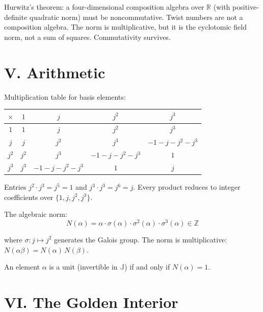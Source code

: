 \documentclass[11pt, a4paper]{article}
\newcommand{\TT}{\mathbb{J}}
\begin{document}
\vspace{0.5em}

Hurwitz's theorem: a four-dimensional composition algebra over $\mathbb{R}$ (with positive-definite quadratic norm) must be noncommutative. Twist numbers are not a composition algebra. The norm is multiplicative, but it is the cyclotomic field norm, not a sum of squares. Commutativity survives.

\section*{V. Arithmetic}

Multiplication table for basis elements:

\renewcommand{\arraystretch}{1.5}
\begin{tabularx}{\textwidth}{CCCCC}
\toprule
$\times$ & $1$ & $j$ & $j^2$ & $j^3$ \\
\midrule
$1$ & $1$ & $j$ & $j^2$ & $j^3$ \\[0.2em]
$j$ & $j$ & $j^2$ & $j^3$ & $-1{-}j{-}j^2{-}j^3$ \\[0.2em]
$j^2$ & $j^2$ & $j^3$ & $-1{-}j{-}j^2{-}j^3$ & $1$ \\[0.2em]
$j^3$ & $j^3$ & $-1{-}j{-}j^2{-}j^3$ & $1$ & $j$ \\
\bottomrule
\end{tabularx}

\vspace{0.5em}

Entries $j^2 \cdot j^3 = j^5 = 1$ and $j^3 \cdot j^3 = j^6 = j$. Every product reduces to integer coefficients over $\{1, j, j^2, j^3\}$.

The algebraic norm:
\begin{equation*}
N(\alpha) = \alpha \cdot \sigma(\alpha) \cdot \sigma^2(\alpha) \cdot \sigma^3(\alpha) \in \mathbb{Z}
\end{equation*}

where $\sigma: j \mapsto j^2$ generates the Galois group. The norm is multiplicative: $N(\alpha\beta) = N(\alpha)\,N(\beta)$.

An element $\alpha$ is a unit (invertible in $\TT$) if and only if $N(\alpha) = 1$.

\section*{VI. The Golden Interior}
\end{document}
